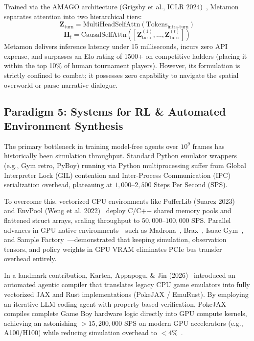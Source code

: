 \documentclass[journal,10pt,twocolumn]{IEEEtran}
\begin{document}
Trained via the AMAGO architecture (Grigsby et al., ICLR 2024)~\cite{grigsby2024amago}, Metamon separates attention into two hierarchical tiers:
\begin{equation}
\mathbf{Z}_{\text{turn}} = \text{MultiHeadSelfAttn}\left( \text{Tokens}_{\text{intra-turn}} \right)
\end{equation}
\begin{equation}
\mathbf{H}_t = \text{CausalSelfAttn}\left( [\mathbf{Z}_{\text{turn}}^{(1)}, \dots, \mathbf{Z}_{\text{turn}}^{(t)}] \right)
\end{equation}
Metamon delivers inference latency under 15 milliseconds, incurs zero API expense, and surpasses an Elo rating of 1500+ on competitive ladders (placing it within the top 10\% of human tournament players). However, its formulation is strictly confined to combat; it possesses zero capability to navigate the spatial overworld or parse narrative dialogue.

\subsection{Paradigm 5: Systems for RL \& Automated Environment Synthesis}
The primary bottleneck in training model-free agents over $10^9$ frames has historically been simulation throughput. Standard Python emulator wrappers (e.g., Gym retro, PyBoy) running via Python multiprocessing suffer from Global Interpreter Lock (GIL) contention and Inter-Process Communication (IPC) serialization overhead, plateauing at $1{,}000$--$2{,}500$ Steps Per Second (SPS).

To overcome this, vectorized CPU environments like PufferLib (Suarez 2023)~\cite{suarez2023pufferlib} and EnvPool (Weng et al. 2022)~\cite{weng2022envpool} deploy C/C++ shared memory pools and flattened struct arrays, scaling throughput to $50{,}000$--$100{,}000$ SPS. Parallel advances in GPU-native environments---such as Madrona~\cite{shacklett2023madrona}, Brax~\cite{freeman2021brax}, Isaac Gym~\cite{makoviychuk2021isaacgym}, and Sample Factory~\cite{petrenko2020samplefactory}---demonstrated that keeping simulation, observation tensors, and policy weights in GPU VRAM eliminates PCIe bus transfer overhead entirely.

In a landmark contribution, Karten, Appapogu, \& Jin (2026)~\cite{karten2026autogen} introduced an automated agentic compiler that translates legacy CPU game emulators into fully vectorized JAX and Rust implementations (PokeJAX / EmuRust). By employing an iterative LLM coding agent with property-based verification, PokeJAX compiles complete Game Boy hardware logic directly into GPU compute kernels, achieving an astonishing $>15{,}200{,}000$ SPS on modern GPU accelerators (e.g., A100/H100) while reducing simulation overhead to $<4\%$~\cite{karten2026autogen}.
\end{document}
